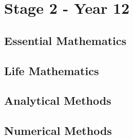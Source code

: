 \documentclass[11pt]{report}
\begin{document}
\section{Stage 2 - Year 12}

\subsection{Essential Mathematics}
\subsection{Life Mathematics}
\subsection{Analytical Methods}
\subsection{Numerical Methods}
\end{document}
